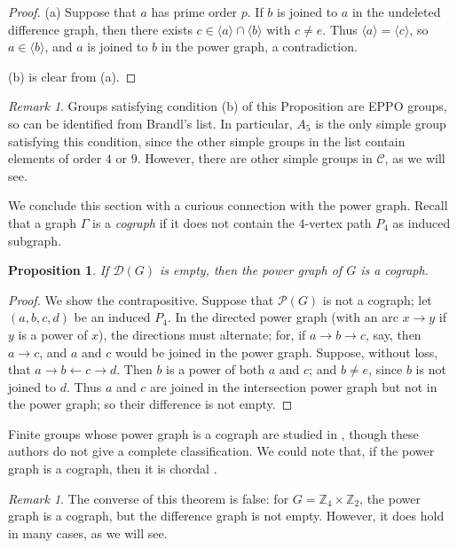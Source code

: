 \documentclass[12pt]{amsart}
\theoremstyle{plain}
\newtheorem{proposition}[theorem]{Proposition}
\theoremstyle{remark}
\newtheorem{remark}[theorem]{Remark}
\theoremstyle{definition}
\begin{document}
\begin{proof}
(a) Suppose that $a$ has prime order $p$. If $b$ is joined to $a$ in the  undeleted
difference graph, then there exists $c\in\langle a\rangle\cap\langle b\rangle$
with $c\ne e$. Thus $\langle a\rangle=\langle c\rangle$, so
$a\in\langle b\rangle$, and $a$ is joined to $b$ in the power graph, a
contradiction.

\smallskip

(b) is clear from (a).
\end{proof}

\begin{remark}
Groups satisfying condition (b) of this Proposition are EPPO groups, so can
be identified from Brandl's list. In particular, $A_5$ is the only simple
group satisfying this condition, since the other simple groups in the list
contain elements of order $4$ or $9$. However, there are other simple groups
in $\mathcal{C}$, as we will see.
\end{remark}

We conclude this section with a curious connection with the power graph. Recall
that a graph $\Gamma$ is a \emph{cograph} if it does not contain the $4$-vertex
path $P_4$ as induced subgraph.

\begin{proposition}\label{p:nulld_implies_cograph}
If $\mathcal{D}(G)$ is empty, then the power graph of $G$ is a cograph.
\end{proposition}

\begin{proof} We show the contrapositive. Suppose that $\mathcal{P}(G)$ is
not a cograph; let $(a,b,c,d)$ be an induced $P_4$. In the directed power
graph (with an arc $x\to y$ if $y$ is a power of $x$), the directions must
alternate; for, if $a\to b\to c$, say, then $a\to c$, and $a$ and $c$ would
be joined in the power graph. Suppose, without loss, that
$a\to b\gets c\to d$. Then $b$ is a power of both $a$ and $c$; and $b\ne e$,
since $b$ is not joined to $d$. Thus $a$ and $c$ are joined in the intersection
power graph but not in the power graph; so their difference is not empty.
\end{proof}

Finite groups whose power graph is a cograph are studied in \cite{cmm}, though
these authors do not give a complete classification. We could note that, if the power graph  is a cograph, then it is chordal \cite{B-F_p-pw-co}.

\begin{remark}
The converse of this theorem is false: for $G=\mathbb{Z}_4\times\mathbb{Z}_2$, the power
graph is a cograph, but the difference graph is not empty. However, it does
hold in many cases, as we will see.
\end{remark}
\end{document}
